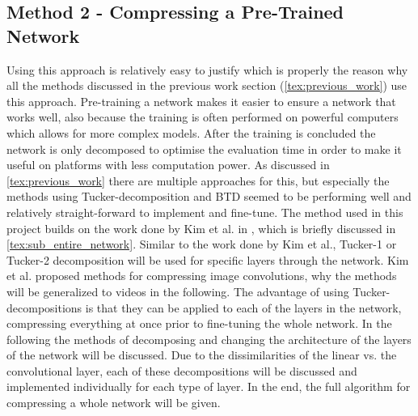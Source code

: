 \subsection{Method 2 - Compressing a Pre-Trained Network}
Using this approach is relatively easy to justify which is properly the reason why all the methods discussed in the previous work section (\autoref{tex:previous_work}) use this approach. Pre-training a network makes it easier to ensure a network that works well, also because the training is often performed on powerful computers which allows for more complex models. After the training is concluded the network is only decomposed to optimise the evaluation time in order to make it useful on platforms with less computation power. As discussed in \autoref{tex:previous_work} there are multiple approaches for this, but especially the methods using Tucker-decomposition and BTD seemed to be performing well and relatively straight-forward to implement and fine-tune.
The method used in this project builds on the work done by Kim et al. in \cite{Kim2016}, which is briefly discussed in \autoref{tex:sub_entire_network}.  Similar to the work done by Kim et al., Tucker-1 or Tucker-2 decomposition will be used for specific layers through the network. Kim et al. proposed methods for compressing image convolutions, why the methods will be generalized to videos in the following. The advantage of using Tucker-decompositions is that they can be applied to each of the layers in the network, compressing everything at once prior to fine-tuning the whole network. In the following the methods of decomposing and changing the architecture of the layers of the network will be discussed. Due to the dissimilarities of the linear vs. the convolutional layer, each of these decompositions will be discussed and implemented individually for each type of layer. In the end, the full algorithm for compressing a whole network will be given.

